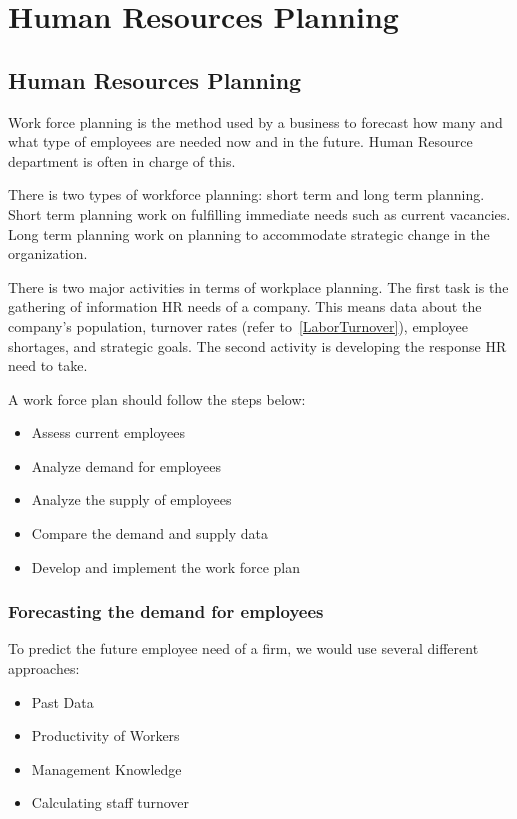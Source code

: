 \documentclass{standalone}
\begin{document}
\section{Human Resources Planning}

\subsection{Human Resources Planning}
Work force planning is the method used by a business to forecast how many and what type of employees are needed now and in the future.
Human Resource department is often in charge of this. 

There is two types of workforce planning: short term and long term planning.
Short term planning work on fulfilling immediate needs such as current vacancies.
Long term planning work on planning to accommodate strategic change in the organization.

There is two major activities in terms of workplace planning.
The first task is the gathering of information HR needs of a company. 
This means data about the company's population, turnover rates (refer to~\ref{LaborTurnover}), employee shortages, and strategic goals.  The second activity is developing the response HR need to take.

A work force plan should follow the steps below:
\begin{itemize}
	\item Assess current employees
	\item Analyze demand for employees
	\item Analyze the supply of employees
	\item Compare the demand and supply data
	\item Develop and implement the work force plan
\end{itemize}

\subsubsection{Forecasting the demand for employees}
To predict the future employee need of a firm, we would use several different approaches:
\begin{itemize}
	\item Past Data
	\item Productivity of Workers
	\item Management Knowledge
	\item Calculating staff turnover
\end{itemize}
\end{document}
